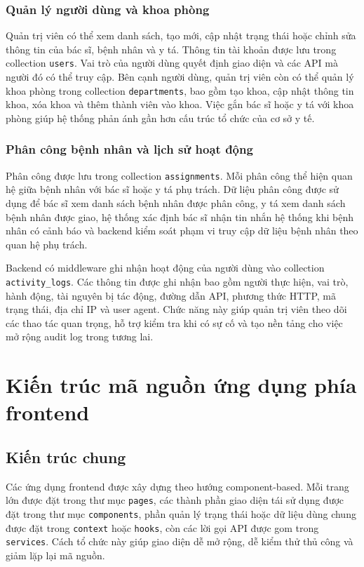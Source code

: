 \subsubsection{Quản lý người dùng và khoa phòng}
\par Quản trị viên có thể xem danh sách, tạo mới, cập nhật trạng thái hoặc chỉnh sửa thông tin của bác sĩ, bệnh nhân và y tá. Thông tin tài khoản được lưu trong collection \texttt{users}. Vai trò của người dùng quyết định giao diện và các API mà người đó có thể truy cập. Bên cạnh người dùng, quản trị viên còn có thể quản lý khoa phòng trong collection \texttt{departments}, bao gồm tạo khoa, cập nhật thông tin khoa, xóa khoa và thêm thành viên vào khoa. Việc gắn bác sĩ hoặc y tá với khoa phòng giúp hệ thống phản ánh gần hơn cấu trúc tổ chức của cơ sở y tế.

\subsubsection{Phân công bệnh nhân và lịch sử hoạt động}
\par Phân công được lưu trong collection \texttt{assignments}. Mỗi phân công thể hiện quan hệ giữa bệnh nhân với bác sĩ hoặc y tá phụ trách. Dữ liệu phân công được sử dụng để bác sĩ xem danh sách bệnh nhân được phân công, y tá xem danh sách bệnh nhân được giao, hệ thống xác định bác sĩ nhận tin nhắn hệ thống khi bệnh nhân có cảnh báo và backend kiểm soát phạm vi truy cập dữ liệu bệnh nhân theo quan hệ phụ trách.

\par Backend có middleware ghi nhận hoạt động của người dùng vào collection \texttt{activity\_logs}. Các thông tin được ghi nhận bao gồm người thực hiện, vai trò, hành động, tài nguyên bị tác động, đường dẫn API, phương thức HTTP, mã trạng thái, địa chỉ IP và user agent. Chức năng này giúp quản trị viên theo dõi các thao tác quan trọng, hỗ trợ kiểm tra khi có sự cố và tạo nền tảng cho việc mở rộng audit log trong tương lai.

\section{Kiến trúc mã nguồn ứng dụng phía frontend}

\subsection{Kiến trúc chung}
\par Các ứng dụng frontend được xây dựng theo hướng component-based. Mỗi trang lớn được đặt trong thư mục \texttt{pages}, các thành phần giao diện tái sử dụng được đặt trong thư mục \texttt{components}, phần quản lý trạng thái hoặc dữ liệu dùng chung được đặt trong \texttt{context} hoặc \texttt{hooks}, còn các lời gọi API được gom trong \texttt{services}. Cách tổ chức này giúp giao diện dễ mở rộng, dễ kiểm thử thủ công và giảm lặp lại mã nguồn.

